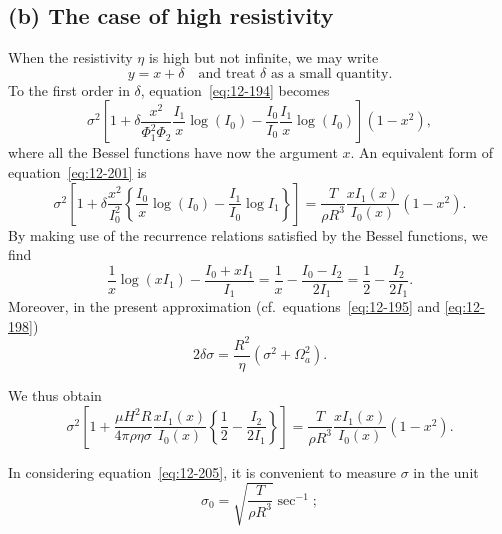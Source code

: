 \subsection*{(b) The case of high resistivity}

When the resistivity $\eta$ is high but not infinite, we may write
\begin{equation}
\label{eq:12-200}
y = x + \delta \quad \text{and treat } \delta \text{ as a small quantity.}
\end{equation}
To the first order in $\delta$, equation~\eqref{eq:12-194} becomes
\begin{equation}
\label{eq:12-201}
\sigma^2\left[1 + \delta \frac{x^2}{\Phi_1^2\Phi_2}\frac{I_1}{x}\log(I_0) - \frac{I_0}{I_0} \frac{I_1}{x} \log(I_0)\right](1-x^2),
\end{equation}
where all the Bessel functions have now the argument $x$. An equivalent form of equation~\eqref{eq:12-201} is
\begin{equation}
\label{eq:12-202}
\sigma^2 \left[1 + \delta\frac{x^2}{I_0^2}\left\{\frac{I_0}{x}\log(I_0) - \frac{I_1}{I_0}\log I_1\right\}\right] = \frac{T}{\rho R^3}\frac{x I_1(x)}{I_0(x)}(1-x^2).
\end{equation}
By making use of the recurrence relations satisfied by the Bessel functions, we find
\begin{equation}
\label{eq:12-203}
\frac{1}{x}\log(xI_1) - \frac{I_0+xI_1}{I_1} = \frac{1}{x} - \frac{I_0-I_2}{2I_1} = \frac{1}{2} - \frac{I_2}{2I_1}.
\end{equation}
Moreover, in the present approximation (cf.\ equations~\eqref{eq:12-195} and \eqref{eq:12-198})
\begin{equation}
\label{eq:12-204}
2\delta\sigma = \frac{R^2}{\eta}(\sigma^2 + \Omega_a^2).
\end{equation}

We thus obtain
\begin{equation}
\label{eq:12-205}
\sigma^2\left[1 + \frac{\mu H^2 R}{4\pi\rho\eta\sigma}\frac{xI_1(x)}{I_0(x)}\left\{\frac{1}{2} - \frac{I_2}{2I_1}\right\}\right] = \frac{T}{\rho R^3}\frac{xI_1(x)}{I_0(x)}(1-x^2).
\end{equation}

In considering equation~\eqref{eq:12-205}, it is convenient to measure $\sigma$ in the unit
\begin{equation}
\label{eq:12-206}
\sigma_0 = \sqrt{\frac{T}{\rho R^3}} \sec^{-1};
\end{equation}

